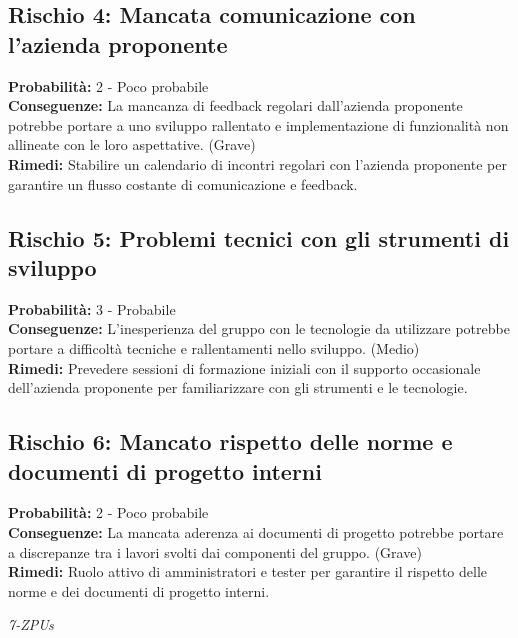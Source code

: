 \documentclass[a4paper,12pt]{article}
\begin{document}
\subsection{Rischio 4: Mancata comunicazione con l'azienda proponente}
\textbf{Probabilità:} 2 - Poco probabile\\
\textbf{Conseguenze:} La mancanza di feedback regolari dall'azienda proponente potrebbe portare a uno sviluppo rallentato e implementazione di funzionalità non allineate con le loro aspettative. (Grave)\\
\textbf{Rimedi:} Stabilire un calendario di incontri regolari con l'azienda proponente per garantire un flusso costante di comunicazione e feedback.

\subsection{Rischio 5: Problemi tecnici con gli strumenti di sviluppo}
\textbf{Probabilità:} 3 - Probabile\\
\textbf{Conseguenze:} L'inesperienza del gruppo con le tecnologie da utilizzare potrebbe portare a difficoltà tecniche e rallentamenti nello sviluppo. (Medio)\\
\textbf{Rimedi:} Prevedere sessioni di formazione iniziali con il supporto occasionale dell'azienda proponente per familiarizzare con gli strumenti e le tecnologie.

\subsection{Rischio 6: Mancato rispetto delle norme e documenti di progetto interni}
\textbf{Probabilità:} 2 - Poco probabile\\
\textbf{Conseguenze:} La mancata aderenza ai documenti di progetto potrebbe portare a discrepanze tra i lavori svolti dai componenti del gruppo. (Grave)\\
\textbf{Rimedi:} Ruolo attivo di amministratori e tester per garantire il rispetto delle norme e dei documenti di progetto interni.


\vspace{0.5cm}


\vfill
\begin{flushright}
    \textit{7-ZPUs}
\end{flushright}
\end{document}
